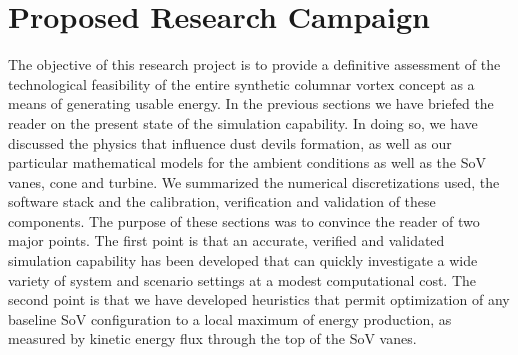 \section{Proposed Research Campaign}
\label{sec:proposed_work}


The objective of this research project is to provide a definitive
assessment of the technological feasibility of the entire synthetic
columnar vortex concept as a means of generating usable energy. In the 
previous sections we have briefed the reader on the present state of the
simulation capability. In doing so, we have discussed the physics that
influence dust devils formation, as well as our particular mathematical
models for the ambient conditions as well as the SoV vanes, cone and
turbine. We summarized the numerical discretizations used, the software
stack and the calibration, verification and validation of these
components. The purpose of these sections was to convince the reader of
two major points. The first point is that an accurate, verified and
validated simulation capability has been developed that can quickly
investigate a wide variety of system and scenario settings at a modest
computational cost. The second point is that we have developed
heuristics that permit optimization of any baseline SoV configuration to
a local maximum of energy production, as measured by kinetic energy flux
through the top of the SoV vanes.  

